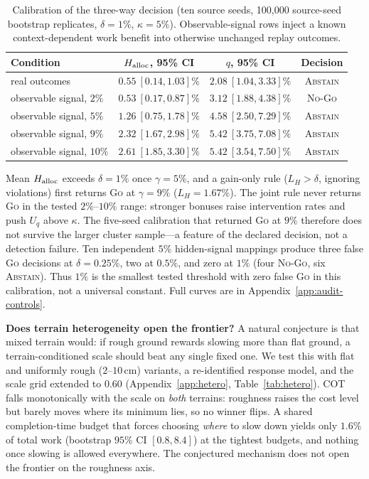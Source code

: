 \documentclass{article}
\begin{document}
\begin{table}[t]
\centering
\caption{Calibration of the three-way decision (ten source seeds, 100{,}000 source-seed bootstrap replicates, $\delta=1\%$, $\kappa=5\%$). Observable-signal rows inject a known context-dependent work benefit into otherwise unchanged replay outcomes.}
\label{tab:audit-calibration}
\begin{tabular}{lccc}
\toprule
Condition & $H_{\rm alloc}$, 95\% CI & $q$, 95\% CI & Decision \\
\midrule
real outcomes & $0.55\ [0.14,1.03]\%$ & $2.08\ [1.04,3.33]\%$ & \textsc{Abstain} \\
observable signal, $2\%$ & $0.53\ [0.17,0.87]\%$ & $3.12\ [1.88,4.38]\%$ & \textsc{No-Go} \\
observable signal, $5\%$ & $1.26\ [0.75,1.78]\%$ & $4.58\ [2.50,7.29]\%$ & \textsc{Abstain} \\
observable signal, $9\%$ & $2.32\ [1.67,2.98]\%$ & $5.42\ [3.75,7.08]\%$ & \textsc{Abstain} \\
observable signal, $10\%$ & $2.61\ [1.85,3.30]\%$ & $5.42\ [3.54,7.50]\%$ & \textsc{Abstain} \\
\bottomrule
\end{tabular}
\end{table}

Mean $H_{\rm alloc}$ exceeds $\delta=1\%$ once $\gamma=5\%$, and a gain-only
rule ($L_H>\delta$, ignoring violations) first returns \textsc{Go} at
$\gamma=9\%$ ($L_H=1.67\%$). The joint rule never returns \textsc{Go} in the
tested $2\%$--$10\%$ range: stronger bonuses raise intervention rates and push
$U_q$ above $\kappa$. The five-seed calibration that returned \textsc{Go} at
$9\%$ therefore does not survive the larger cluster sample---a feature of the
declared decision, not a detection failure. Ten independent $5\%$ hidden-signal
mappings produce three false \textsc{Go} decisions at $\delta=0.25\%$, two at
$0.5\%$, and zero at $1\%$ (four \textsc{No-Go}, six \textsc{Abstain}). Thus
$1\%$ is the smallest tested threshold with zero false \textsc{Go} in this
calibration, not a universal constant. Full curves are in
Appendix~\ref{app:audit-controls}.

\textbf{Does terrain heterogeneity open the frontier?}
A natural conjecture is that mixed terrain would: if rough ground rewards
slowing more than flat ground, a terrain-conditioned scale should beat any
single fixed one. We test this with flat and uniformly rough ($2$--$10$\,cm)
variants, a re-identified response model, and the scale grid extended to $0.60$
(Appendix~\ref{app:hetero}, Table~\ref{tab:hetero}). COT falls monotonically with
the scale on \emph{both} terrains: roughness raises the cost level but barely
moves where its minimum lies, so no winner flips. A shared completion-time budget
that forces choosing \emph{where} to slow down yields only $1.6\%$ of total work
(bootstrap $95\%$ CI $[0.8, 8.4]$) at the tightest budgets, and nothing once
slowing is allowed everywhere. The conjectured mechanism does not open the
frontier on the roughness axis.
\end{document}
